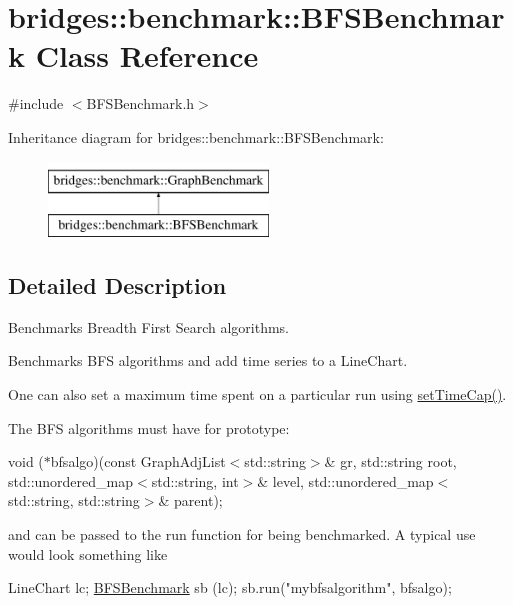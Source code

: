 \hypertarget{classbridges_1_1benchmark_1_1_b_f_s_benchmark}{}\section{bridges\+:\+:benchmark\+:\+:B\+F\+S\+Benchmark Class Reference}
\label{classbridges_1_1benchmark_1_1_b_f_s_benchmark}


{\ttfamily \#include $<$B\+F\+S\+Benchmark.\+h$>$}

Inheritance diagram for bridges\+:\+:benchmark\+:\+:B\+F\+S\+Benchmark\+:\begin{figure}[H]
\begin{center}
\leavevmode
\includegraphics[height=2.000000cm]{classbridges_1_1benchmark_1_1_b_f_s_benchmark}
\end{center}
\end{figure}


\subsection{Detailed Description}
Benchmarks Breadth First Search algorithms. 

Benchmarks B\+FS algorithms and add time series to a Line\+Chart.

One can also set a maximum time spent on a particular run using \mbox{\hyperlink{classbridges_1_1benchmark_1_1_graph_benchmark_a56934eb2789e54c088e7b4423c3a7456}{set\+Time\+Cap()}}.

The B\+FS algorithms must have for prototype\+:

void ($\ast$bfsalgo)(const Graph\+Adj\+List$<$std\+::string$>$\& gr, std\+::string root, std\+::unordered\+\_\+map$<$std\+::string, int$>$\& level, std\+::unordered\+\_\+map$<$std\+::string, std\+::string$>$\& parent);

and can be passed to the run function for being benchmarked. A typical use would look something like


\begin{DoxyCode}
LineChart lc;
\mbox{\hyperlink{classbridges_1_1benchmark_1_1_b_f_s_benchmark_abd3525c2c0512a397c29ca41ae6982df}{BFSBenchmark}} sb (lc);
sb.run(\textcolor{stringliteral}{"mybfsalgorithm"}, bfsalgo);
\end{DoxyCode}


